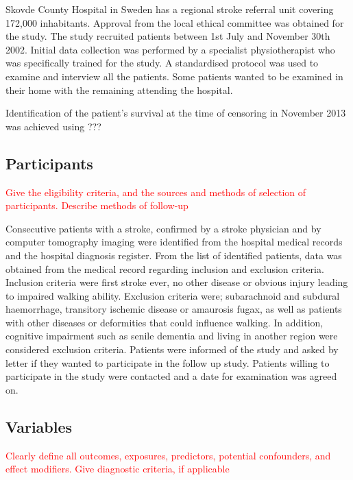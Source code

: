 \documentclass[a4paper,12pt]{article}
\begin{document}
Skovde County Hospital in Sweden has a regional stroke referral unit covering 172,000 inhabitants. Approval from the local ethical committee was obtained for the study. The study recruited patients between 1st July and November 30th 2002. Initial data collection was performed by a specialist physiotherapist who was specifically trained for the study. A standardised protocol was used to examine and interview all the patients. Some patients wanted to be examined in their home with the remaining attending the hospital.

Identification of the patient's survival at the time of censoring in November 2013 was achieved using ??? 

\subsection{Participants}\textcolor{red}{Give the eligibility criteria, and the sources and methods of selection of participants. Describe methods of follow-up}

Consecutive patients with a stroke, confirmed by a stroke physician and by computer tomography imaging were identified from the hospital medical records and the hospital diagnosis register. From the list of identified patients, data was obtained from the medical record regarding inclusion and exclusion criteria. Inclusion criteria were first stroke ever, no other disease or obvious injury leading to impaired walking ability. Exclusion criteria were; subarachnoid and subdural haemorrhage, transitory ischemic disease or amaurosis fugax, as well as patients with other diseases or deformities that could influence walking. In addition, cognitive impairment such as senile dementia and living in another region were considered exclusion criteria. Patients were informed of the study and asked by letter if they wanted to participate in the follow up study. Patients willing to participate in the study were contacted and a date for examination was agreed on. 

\subsection{Variables} \textcolor{red}{Clearly define all outcomes, exposures, predictors, potential confounders, and effect modifiers. Give diagnostic criteria, if applicable}
\end{document}
